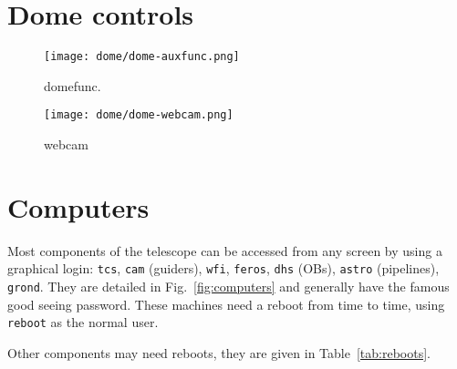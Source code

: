 \documentclass[11pt,fleqn]{book} %
\begin{document}
\section{Dome controls}
\begin{figure}[!ht]
\centering
\texttt{[image: dome/dome-auxfunc.png]}
\caption{\gls{domefunc}.}
\label{fig:domefunc}
\end{figure}

\begin{figure}[!ht]
\centering
  \texttt{[image: dome/dome-webcam.png]}%
\caption{\gls{webcam}}
\label{fig:webcam}
\end{figure}

\section{Computers}
Most components of the telescope can be accessed from any screen by using a graphical login: \texttt{tcs}, \texttt{cam} (guiders), \texttt{wfi}, \texttt{feros}, \texttt{dhs} (OBs), \texttt{astro} (pipelines), \texttt{grond}.  They are detailed in Fig.~\ref{fig:computers} and generally have the famous good seeing password. These machines need a reboot from time to time, using \texttt{reboot} as the normal user.  

Other components may need reboots, they are given in Table~\ref{tab:reboots}. 
\end{document}
